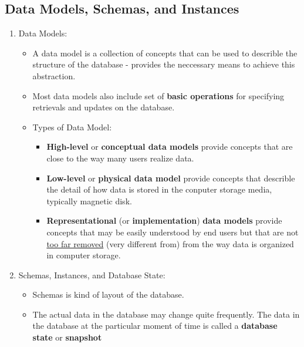 \documentclass[10pt]{article}
\begin{document}
\subsection{Data Models, Schemas, and Instances}
\begin{enumerate}
	\item Data Models:
	\begin{itemize}
		\item A data model is a collection of concepts that can be used to describle the structure of the database - provides the neccessary means to achieve this abstraction.
		\item Most data models also include set of \textbf{basic operations} for specifying retrievals and updates on the database.
		\item Types of Data Model:
		\begin{itemize}
			\item \textbf{High-level} or \textbf{conceptual data models} provide concepts that are close to the way many users realize data.
			\item \textbf{Low-level} or \textbf{physical data model} provide concepts that describle the detail of how data is stored in the conputer storage media, typically magnetic disk.
			\item \textbf{Representational} (or \textbf{implementation}) \textbf{data models} provide concepts that may be easily understood by end users but that are not \underline{too far removed} (very different from) from the way data is organized in computer storage.
		\end{itemize}
	\end{itemize}

	\item Schemas, Instances, and Database State:
	\begin{itemize}
		\item Schemas is kind of layout of the database.
		\item The actual data in the database may change quite frequently. The data in the database at the particular moment of time is called a \textbf{database state} or \textbf{snapshot}
	\end{itemize}
\end{enumerate}
\end{document}
